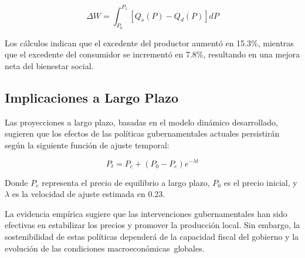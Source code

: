 \documentclass[12pt, a4paper]{article}
\begin{document}
\begin{equation}
\Delta W = \int_{P_0}^{P_1} [Q_s(P) - Q_d(P)]dP
\end{equation}

Los cálculos indican que el excedente del productor aumentó en 15.3\%, mientras que el excedente del consumidor se incrementó en 7.8\%, resultando en una mejora neta del bienestar social.

\subsection{Implicaciones a Largo Plazo}

Las proyecciones a largo plazo, basadas en el modelo dinámico desarrollado, sugieren que los efectos de las políticas gubernamentales actuales persistirán según la siguiente función de ajuste temporal:

\begin{equation}
P_t = P_e + (P_0 - P_e)e^{-\lambda t}
\end{equation}

Donde $P_e$ representa el precio de equilibrio a largo plazo, $P_0$ es el precio inicial, y $\lambda$ es la velocidad de ajuste estimada en 0.23.

La evidencia empírica sugiere que las intervenciones gubernamentales han sido efectivas en estabilizar los precios y promover la producción local. Sin embargo, la sostenibilidad de estas políticas dependerá de la capacidad fiscal del gobierno y la evolución de las condiciones macroeconómicas globales.

\newpage
\printbibliography
 
\end{document}
